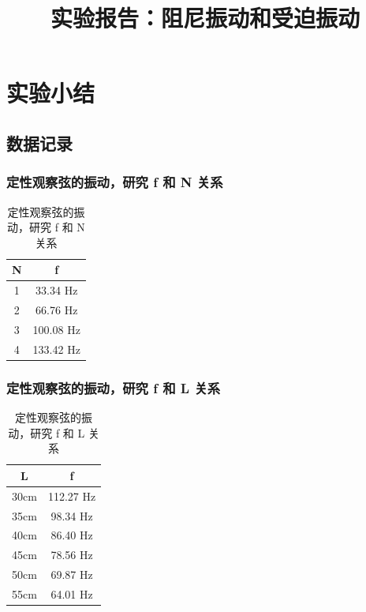 \documentclass[12pt,a4paper]{amsart}
\title{实验报告：阻尼振动和受迫振动}
\begin{document}
\maketitle

\section{实验小结}

\subsection{数据记录}

\subsubsection{定性观察弦的振动，研究 f 和 N 关系}

\begin{table}[H]
    \centering
    \caption{定性观察弦的振动，研究 f 和 N 关系}
    \begin{tabular}{cc} %
        \toprule
        N & f \\            
        \midrule
        1 & 33.34 Hz \\
        2 & 66.76 Hz \\
        3 & 100.08 Hz \\
        4 & 133.42 Hz \\
        \bottomrule
    \end{tabular}
    \label{chart}
\end{table}

\subsubsection{定性观察弦的振动，研究 f 和 L 关系}

\begin{table}[H]
    \centering
    \caption{定性观察弦的振动，研究 f 和 L 关系}
    \begin{tabular}{cc} %
        \toprule
        L & f \\            
        \midrule
        30cm & 112.27 Hz \\
        35cm & 98.34 Hz \\
        40cm & 86.40 Hz \\
        45cm & 78.56 Hz \\
        50cm & 69.87 Hz \\
        55cm & 64.01 Hz \\
        \bottomrule
    \end{tabular}
    \label{chart}
\end{table}
\end{document}
